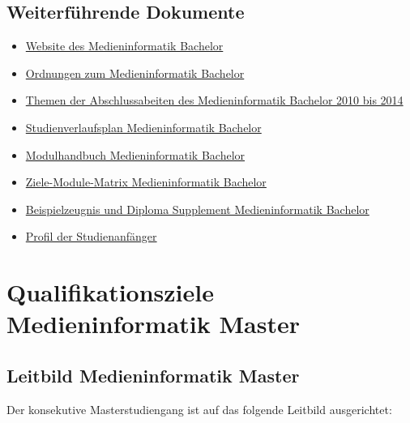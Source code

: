 \subsection{Weiterführende
Dokumente}\label{weiterfuxfchrende-dokumente}

\begin{itemize}
\tightlist
\item
  \href{https://www.th-koeln.de/studium/medieninformatik-bachelor_2379.php}{Website
  des Medieninformatik Bachelor}
\item
  \href{https://www.th-koeln.de/studium/medieninformatik-bachelor--ordnungen-und-formulare_3963.php}{Ordnungen
  zum Medieninformatik Bachelor}
\item
  \href{https://th-koeln.github.io/mi-2017/anhaenge/ba-abschlussarbeiten_2010-2014_.pdf}{Themen der
  Abschlussabeiten des Medieninformatik Bachelor 2010 bis 2014}
\item
  \href{https://th-koeln.github.io/mi-2017/anhaenge/ba-studienverlaufsplan.pdf}{Studienverlaufsplan
  Medieninformatik Bachelor}
\item
  \href{https://th-koeln.github.io/mi-2017/anhaenge/medieninformatik-bachelor-modulhandbuch.pdf}{Modulhandbuch
  Medieninformatik Bachelor}
\item
  \href{https://th-koeln.github.io/mi-2017/anhaenge/ba-Ziele-Module-Matrix-Medieninformatik-Bachelor.pdf}{Ziele-Module-Matrix
  Medieninformatik Bachelor}
\item
  \href{https://th-koeln.github.io/mi-2017/anhaenge/ba-zeugnis.pdf}{Beispielzeugnis und Diploma
  Supplement Medieninformatik Bachelor}
\item
  \href{https://th-koeln.github.io/mi-2017/anhaenge/stat-profil-studienanfaenger-2017.pdf}{Profil der
  Studienanfänger}
\end{itemize}

\section{Qualifikationsziele Medieninformatik
Master}\label{qualifikationsziele-medieninformatik-master}

\subsection{Leitbild Medieninformatik
Master}\label{leitbild-medieninformatik-master}

Der konsekutive Masterstudiengang ist auf das folgende Leitbild
ausgerichtet:

